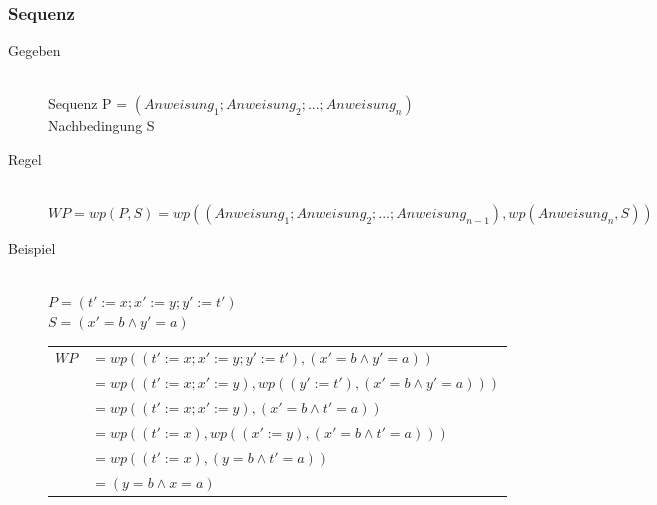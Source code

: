 \documentclass[a4paper,10pt]{article}
\begin{document}
\subsubsection{Sequenz}
\begin{description}
	\item[Gegeben] \hfill \\
		Sequenz P = $(Anweisung_1; Anweisung_2; ...; Anweisung_n)$ \\
		Nachbedingung S
	\item[Regel] \hfill \\
		$WP = wp(P, S) =
wp((Anweisung_1; Anweisung_2; ...; Anweisung_{n-1}), wp(Anweisung_n, S))$
	\item[Beispiel] \hfill \\
		$P = (t' := x; x' := y; y' := t')$ \\
		$S = (x' = b \wedge y' = a)$ \\
		\begin{tabular}{ll}
		$WP $&$=wp((t':=x;x':=y;y':=t'),(x'=b \wedge y'=a))$ \\
		&$= wp((t' := x; x' := y), wp((y' := t'), (x' = b \wedge y' = a)))$ \\
		&$= wp((t' := x; x' := y), (x' = b \wedge t' = a))$ \\
		&$= wp((t' := x), wp((x' := y), (x' = b \wedge t' = a)))$ \\
		&$= wp((t' := x), (y = b \wedge t' = a))$ \\
		&$= (y = b \wedge x = a)$
		\end{tabular}
\end{description}
\end{document}
